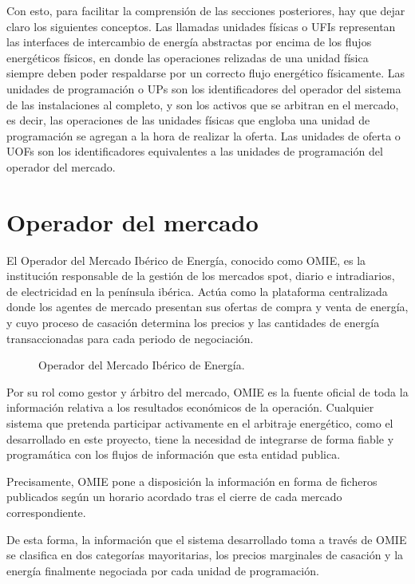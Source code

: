 Con esto, para facilitar la comprensión de las secciones posteriores, hay que dejar claro los siguientes conceptos. Las llamadas unidades físicas o UFIs representan las interfaces de intercambio de energía abstractas por encima de los flujos energéticos físicos, en donde las operaciones relizadas de una unidad física siempre deben poder respaldarse por un correcto flujo energético físicamente. Las unidades de programación o UPs son los identificadores del operador del sistema de las instalaciones al completo, y son los activos que se arbitran en el mercado, es decir, las operaciones de las unidades físicas que engloba una unidad de programación se agregan a la hora de realizar la oferta. Las unidades de oferta o UOFs son los identificadores equivalentes a las unidades de programación del operador del mercado.

\section{Operador del mercado}
\label{makereference4.1}

El Operador del Mercado Ibérico de Energía, conocido como OMIE, es la institución responsable de la gestión de los mercados spot, diario e intradiarios, de electricidad en la península ibérica. Actúa como la plataforma centralizada donde los agentes de mercado presentan sus ofertas de compra y venta de energía, y cuyo proceso de casación determina los precios y las cantidades de energía transaccionadas para cada periodo de negociación.

\begin{figure}
  \centering
  \caption{Operador del Mercado Ibérico de Energía.}
  \label{fig:omie}
\end{figure}

Por su rol como gestor y árbitro del mercado, OMIE es la fuente oficial de toda la información relativa a los resultados económicos de la operación. Cualquier sistema que pretenda participar activamente en el arbitraje energético, como el desarrollado en este proyecto, tiene la necesidad de integrarse de forma fiable y programática con los flujos de información que esta entidad publica.

Precisamente, OMIE pone a disposición la información en forma de ficheros publicados según un horario acordado tras el cierre de cada mercado correspondiente.

De esta forma, la información que el sistema desarrollado toma a través de OMIE se clasifica en dos categorías mayoritarias, los precios marginales de casación y la energía finalmente negociada por cada unidad de programación.

